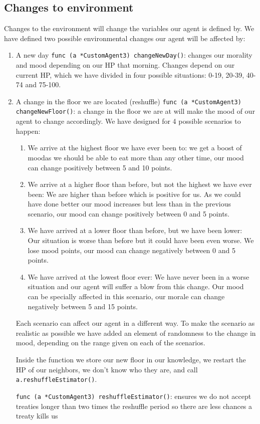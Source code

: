 \subsection{Changes to environment}
Changes to the environment will change the variables our agent is defined by. We have defined two possible environmental changes our agent will be affected by:
\begin{enumerate}
    \item A new day \texttt{func (a *CustomAgent3) changeNewDay()}: changes our morality and mood depending on our HP that morning. Changes depend on our current HP, which we have divided in four possible situations: 0-19, 20-39, 40-74 and 75-100.
    \item A change in the floor we are located (reshuffle) \texttt{func (a *CustomAgent3) changeNewFloor()}: a change in the floor we are at will make the mood of our agent to change accordingly. We have designed for 4 possible scenarios to happen: 
    \begin{enumerate}
        \item We arrive at the highest floor we have ever been to: we get a boost of moodas we should be able to eat more than any other time, our mood can change positively between 5 and 10 points.
        \item We arrive at a higher floor than before, but not the highest we have ever been: We are higher than before which is positive for us. As we could have done better our mood increases but less than in the previous scenario, our mood can change positively between 0 and 5 points.
        \item We have arrived at a lower floor than before, but we have been lower: Our situation is worse than before but it could have been even worse. We lose mood points, our mood can change negatively between 0 and 5 points.
        \item We have arrived at the lowest floor ever: We have never been in a worse situation and our agent will suffer a blow from this change. Our mood can be specially affected in this scenario, our morale can change negatively between 5 and 15 points.
    \end{enumerate}
    Each scenario can affect our agent in a different way. To make the scenario as realistic as possible we have added an element of randomness to the change in mood, depending on the range given on each of the scenarios. \par
    Inside the function we store our new floor in our knowledge, we restart the HP of our neighbors, we don’t know who they are, and call \texttt{a.reshuffleEstimator()}. \par
    \texttt{func (a *CustomAgent3) reshuffleEstimator()}: ensures we do not accept treaties longer than two times the reshuffle period so there are less chances a treaty kills us 
\end{enumerate}
